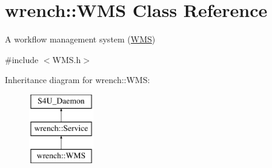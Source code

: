 \hypertarget{classwrench_1_1_w_m_s}{}\section{wrench\+:\+:W\+MS Class Reference}
\label{classwrench_1_1_w_m_s}


A workflow management system (\hyperlink{classwrench_1_1_w_m_s}{W\+MS})  




{\ttfamily \#include $<$W\+M\+S.\+h$>$}

Inheritance diagram for wrench\+:\+:W\+MS\+:\begin{figure}[H]
\begin{center}
\leavevmode
\includegraphics[height=3.000000cm]{classwrench_1_1_w_m_s}
\end{center}
\end{figure}
